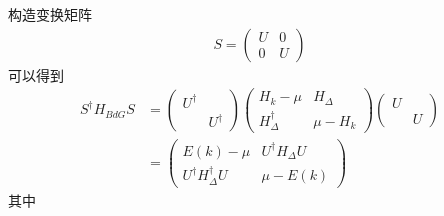 \documentclass[22pt]{article}
\begin{document}
构造变换矩阵
\begin{align}
	S=
	\begin{pmatrix}
		U &0 \\
		0&U
	\end{pmatrix}
\end{align}
可以得到
\begin{align}
	S^{\dagger}H_{BdG}S&=
	\begin{pmatrix}
		U^{\dagger} & \\
		&U^{\dagger}
	\end{pmatrix}
\begin{pmatrix}
		H_k-\mu  &  H_{\Delta} \\
	H_{\Delta}^{\dagger} & \mu-H_k
\end{pmatrix}
\begin{pmatrix}
	U & \\
	&U
\end{pmatrix}\\
&=
\begin{pmatrix}
	E(k)-\mu  & U^{\dagger}H_{\Delta}U \\
	U^{\dagger}H_{\Delta}^{\dagger}U & \mu-E(k)
\end{pmatrix}
\end{align}
其中
\end{document}
